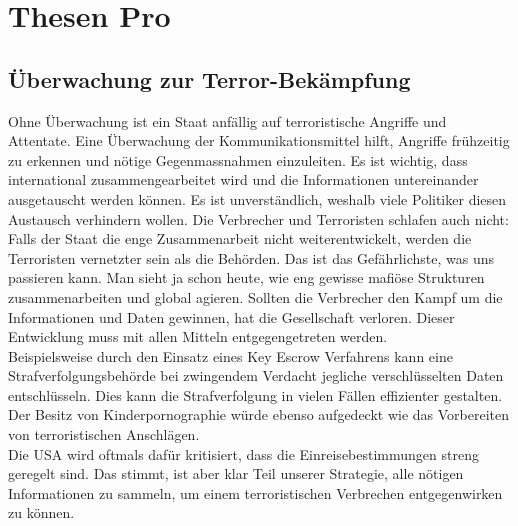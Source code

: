 \section{Thesen Pro}
\subsection{Überwachung zur Terror-Bekämpfung}
Ohne Überwachung ist ein Staat anfällig auf terroristische Angriffe und 
Attentate. Eine Überwachung der Kommunikationsmittel hilft, Angriffe 
frühzeitig zu erkennen und nötige Gegenmassnahmen einzuleiten. Es ist 
wichtig, dass international zusammengearbeitet wird und die 
Informationen untereinander ausgetauscht werden können. Es ist 
unverst\"andlich, weshalb viele Politiker diesen Austausch verhindern wollen. Die 
Verbrecher und Terroristen schlafen auch nicht: Falls der Staat die enge 
Zusammenarbeit nicht weiterentwickelt, werden die Terroristen vernetzter sein als 
die Beh\"orden. Das ist das Gefährlichste, was uns passieren kann. Man sieht ja 
schon heute, wie eng gewisse mafiöse Strukturen zusammenarbeiten und 
global agieren. Sollten die Verbrecher den Kampf um die Informationen 
und Daten gewinnen, hat die Gesellschaft verloren. Dieser Entwicklung
muss mit allen Mitteln entgegengetreten werden.\\
Beispielsweise durch den Einsatz eines Key Escrow Verfahrens kann eine 
Strafverfolgungsbehörde bei zwingendem Verdacht jegliche 
verschlüsselten Daten entschlüsseln. Dies kann die Strafverfolgung in 
vielen Fällen effizienter gestalten. Der Besitz von Kinderpornographie 
würde ebenso aufgedeckt wie das Vorbereiten von terroristischen 
Anschlägen.\\
Die USA wird oftmals dafür kritisiert, dass die 
Einreisebestimmungen streng geregelt sind. Das stimmt, ist aber klar 
Teil unserer Strategie, alle nötigen Informationen zu sammeln, um einem 
terroristischen Verbrechen entgegenwirken zu können.

